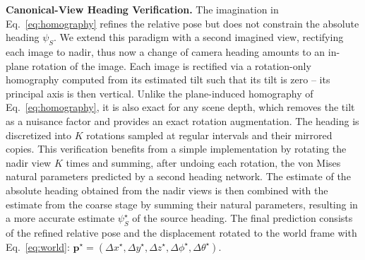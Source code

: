 \noindent\textbf{Canonical-View Heading Verification.}
The imagination in Eq.~\eqref{eq:homography} refines the relative pose but does not constrain the absolute heading $\psi_S$. We extend this paradigm with a second imagined view, rectifying each image to nadir, thus now a change of camera heading amounts to an in-plane rotation of the image. Each image is rectified via a rotation-only homography computed from its estimated tilt such that its tilt is zero -- its principal axis is then vertical. Unlike the plane-induced homography of Eq.~\eqref{eq:homography}, it is also exact for any scene depth, which removes the tilt as a nuisance factor and provides an exact rotation augmentation. The heading is discretized into $K$ rotations sampled at regular intervals and their mirrored copies. This verification benefits from a simple implementation by rotating the nadir view $K$ times and summing, after undoing each rotation, the von Mises natural parameters predicted by a second heading network. The estimate of the absolute heading obtained from the nadir views is then combined with the estimate from the coarse stage by summing their natural parameters, resulting in a more accurate estimate $\psi_S^\star$ of the source heading. The final prediction consists of the refined relative pose and the displacement rotated to the world frame with Eq.~\eqref{eq:world}: $\mathbf{p}^\star=(\Delta x^\star,\Delta y^\star,\Delta z^\star,\Delta\phi^\star,\Delta\theta^\star)$.

